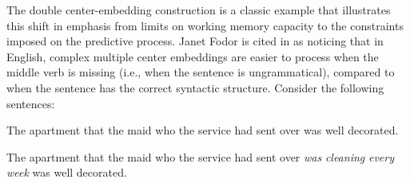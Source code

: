 \documentclass{cambridge7A}\usepackage[]{graphicx}\usepackage[]{color}
\begin{document}
The double center-embedding construction is a classic example that
illustrates this shift in emphasis from limits on working memory 
capacity to the constraints imposed on the predictive process.
Janet Fodor is cited in \cite{frazier85} as noticing that in
English, complex multiple center embeddings are  easier to process when the middle verb is missing (i.e.,
when the sentence is ungrammatical), compared to when the sentence has
the correct syntactic structure. Consider the following sentences:

\begin{exe}
\ex \label{ungramCE}
\begin{xlist}
\item *The apartment that the maid who the service had sent over was well decorated.
\item The apartment that the maid who the service had sent over \textit{was} \textit{cleaning} \textit{every} \textit{week} was well decorated.
\end{xlist}
\end{exe}
\end{document}
